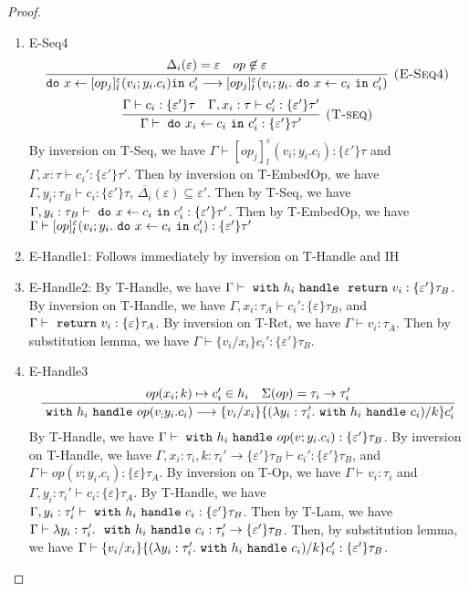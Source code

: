 \begin{proof}
\begin{enumerate}
\item E-Seq4
$$
\infer[\textsc{(E-Seq4)}]
  {\texttt{do}\ x \leftarrow [op_j]^\varepsilon_l(v_i; y_i.c_i) \texttt{in}\ c_i' \longrightarrow [op_j]^\varepsilon_l(v_i; y_i. \m{do} x \leftarrow c_i \m{in} c_i')}
  {\Delta_i(\varepsilon) = \varepsilon & op \not \in \varepsilon} $$
$$
\infer[\textsc{(T-seq)}]
  {\Gamma\vdash \m{do} x_i \leftarrow c_i \m{in} c_i' : \{\varepsilon'\}\tau' }
  {\Gamma \vdash c_i : \{\varepsilon'\}\tau & \Gamma, x_i:\tau \vdash c_i': \{\varepsilon'\}\tau'}  $$
By inversion on T-Seq, we have $\Gamma \vdash [op_j]^\varepsilon_l(v_i; y_i.c_i): \{\varepsilon'\}\tau$ and $\Gamma, x:\tau \vdash c_i' : \{\varepsilon'\} \tau'$. Then by inversion on T-EmbedOp, we have $\Gamma, y_i:\tau_B \vdash c_i: \{\varepsilon'\}\tau$, $\overline{\Delta_i}(\varepsilon) \subseteq \varepsilon'$.
Then by T-Seq, we have $\Gamma, y_i:\tau_B \vdash \ \texttt{do}\  x \leftarrow c_i \ \texttt{in}\  c_i' : \{\varepsilon'\}\tau'$. Then by T-EmbedOp, we have $\Gamma \vdash [op]^\varepsilon_l(v_i; y_i.  \ \texttt{do}\  x \leftarrow c_i \ \texttt{in}\  c_i' ): \{\varepsilon'\}\tau'$

\item E-Handle1: Follows immediately by inversion on T-Handle and IH
\item E-Handle2: By T-Handle, we have $\Gamma \vdash \ \texttt{with}\  h_i \ \texttt{handle}\  \ \texttt{return}\  v_i :  \{\varepsilon'\}\tau_B$. By inversion on T-Handle, we have $\Gamma, x_i:\tau_A \vdash c_i' : \{\varepsilon\}\tau_B$, and $\Gamma \vdash \ \texttt{return}\  v_i : \{\varepsilon\} \tau_A$. By inversion on T-Ret, we have $\Gamma \vdash v_i : \tau_A$. Then by substitution lemma, we have $\Gamma \vdash \{v_i/x_i\}c_i' : \{\varepsilon'\}\tau_B$. 

\item E-Handle3
$$
\infer  {\m{with} h_i \m{handle} op(v_; y_i.c_i) \longrightarrow \{v_i/x_i\} \{(\lambda y_i: \tau_i'.
   \m{with} h_i\m{handle} c_i) / k\}c_i' }
  {op(x_i; k) \mapsto c_i' \in h_i & \Sigma(op) = \tau_i \rightarrow \tau_i'} 
$$
By T-Handle, we have $\Gamma \vdash \ \texttt{with}\  h_i \ \texttt{handle}\  op(v;y_i.c_i) :  \{\varepsilon'\}\tau_B$. By inversion on T-Handle, we have $\Gamma, x_i:\tau_i, k: \tau_i' \rightarrow \{\varepsilon'\}\tau_B \vdash c_i' : \{\varepsilon'\} \tau_B$, and $\Gamma \vdash op(v; y_i.c_i) : \{\varepsilon\} \tau_A$. By inversion on T-Op, we have $\Gamma \vdash v_i : \tau_i$ and $\Gamma, y_i: \tau_i' \vdash c_i: \{\varepsilon\}\tau_A$. By T-Handle, we have $\Gamma, y_i: \tau_i' \vdash \ \texttt{with}\  h_i \ \texttt{handle}\  c_i : \{\varepsilon'\}\tau_B$. Then by T-Lam, we have $\Gamma \vdash \lambda y_i:\tau_i'.\ \ \texttt{with}\  h_i \ \texttt{handle}\  c_i : \tau_i' \rightarrow  \{\varepsilon'\}\tau_B$. Then, by substitution lemma, we have $\Gamma \vdash \{v_i/x_i\} \{(\lambda y_i: \tau_i'.
   \ \texttt{with}\  h_i\ \texttt{handle}\  c_i) / k\}c_i' : \{\varepsilon'\}\tau_B$.
   

\end{enumerate}
\end{proof}
